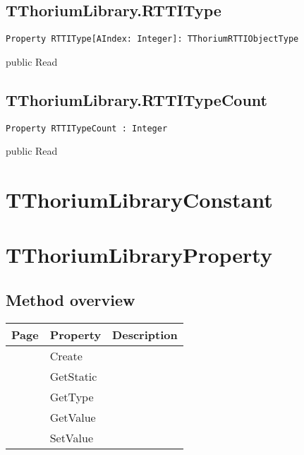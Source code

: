 \subsection{TThoriumLibrary.RTTIType}
\label{thoriumcore:thorium:tthoriumlibrary:rttitype}
\begin{FPCList}
\Synopsis
\Declaration 

\begin{verbatim}
Property RTTIType[AIndex: Integer]: TThoriumRTTIObjectType
\end{verbatim}
\Visibility
public
\Access
Read
\Description
\end{FPCList}
\subsection{TThoriumLibrary.RTTITypeCount}
\label{thoriumcore:thorium:tthoriumlibrary:rttitypecount}
\begin{FPCList}
\Synopsis
\Declaration 

\begin{verbatim}
Property RTTITypeCount : Integer
\end{verbatim}
\Visibility
public
\Access
Read
\Description
\end{FPCList}
\section{TThoriumLibraryConstant}
\label{thoriumcore:thorium:tthoriumlibraryconstant}
\section{TThoriumLibraryProperty}
\label{thoriumcore:thorium:tthoriumlibraryproperty}
\subsection{Method overview}
\label{thoriumcore:thorium:tthoriumlibraryproperty:methods}
\begin{tabularx}{\textwidth}{llX}
Page & Property & Description  \\ \hline
\pageref{thoriumcore:thorium:tthoriumlibraryproperty:create} & Create  &  \\
\pageref{thoriumcore:thorium:tthoriumlibraryproperty:getstatic} & GetStatic  &  \\
\pageref{thoriumcore:thorium:tthoriumlibraryproperty:gettype} & GetType  &  \\
\pageref{thoriumcore:thorium:tthoriumlibraryproperty:getvalue} & GetValue  &  \\
\pageref{thoriumcore:thorium:tthoriumlibraryproperty:setvalue} & SetValue  &  \\
\hline
\end{tabularx}
